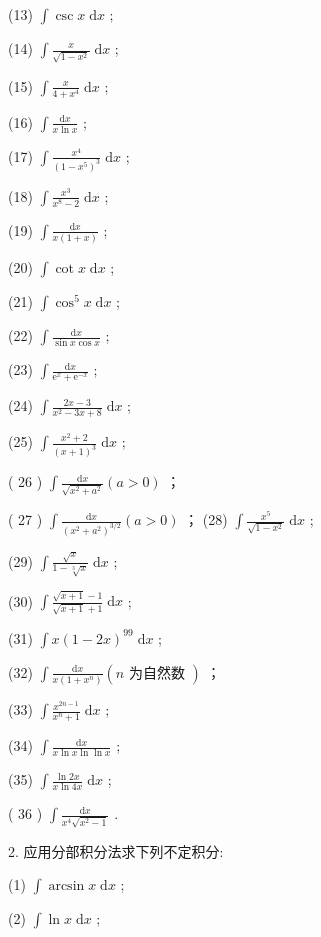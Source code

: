 (13) \(\int \csc x\mathrm{\;d}x\) ;

(14) \(\int \frac{x}{\sqrt{1 - {x}^{2}}}\mathrm{\;d}x\) ;

(15) \(\int \frac{x}{4 + {x}^{4}}\mathrm{\;d}x\) ;

(16) \(\int \frac{\mathrm{d}x}{x\ln x}\) ;

(17) \(\int \frac{{x}^{4}}{{\left( 1 - {x}^{5}\right) }^{3}}\mathrm{\;d}x\) ;

(18) \(\int \frac{{x}^{3}}{{x}^{8} - 2}\mathrm{\;d}x\) ;

(19) \(\int \frac{\mathrm{d}x}{x\left( {1 + x}\right) }\) ;

(20) \(\int \cot x\mathrm{\;d}x\) ;

(21) \(\int {\cos }^{5}x\mathrm{\;d}x\) ;

(22) \(\int \frac{\mathrm{d}x}{\sin x\cos x}\) ;

(23) \(\int \frac{\mathrm{d}x}{{\mathrm{e}}^{x} + {\mathrm{e}}^{-x}}\) ;

(24) \(\int \frac{{2x} - 3}{{x}^{2} - {3x} + 8}\mathrm{\;d}x\) ;

(25) \(\int \frac{{x}^{2} + 2}{{\left( x + 1\right) }^{3}}\mathrm{\;d}x\) ;

( 26 ) \(\int \frac{\mathrm{d}x}{\sqrt{{x}^{2} + {a}^{2}}}\left( {a > 0}\right)\) ；

( 27 ) \(\int \frac{\mathrm{d}x}{{\left( {x}^{2} + {a}^{2}\right) }^{3/2}}\left( {a > 0}\right)\) ； (28) \(\int \frac{{x}^{5}}{\sqrt{1 - {x}^{2}}}\mathrm{\;d}x\) ;

(29) \(\int \frac{\sqrt{x}}{1 - \sqrt[3]{x}}\mathrm{\;d}x\) ;

(30) \(\int \frac{\sqrt{x + 1} - 1}{\sqrt{x + 1} + 1}\mathrm{\;d}x\) ;

(31) \(\int x{\left( 1 - 2x\right) }^{99}\mathrm{\;d}x\) ;

(32) \(\int \frac{\mathrm{d}x}{x\left( {1 + {x}^{n}}\right) }\left( {n\text{ 为自然数 }}\right)\) ；

(33) \(\int \frac{{x}^{{2n} - 1}}{{x}^{n} + 1}\mathrm{\;d}x\) ;

(34) \(\int \frac{\mathrm{d}x}{x\ln x\ln \ln x}\) ;

(35) \(\int \frac{\ln {2x}}{x\ln {4x}}\mathrm{\;d}x\) ;

( 36 ) \(\int \frac{\mathrm{d}x}{{x}^{4}\sqrt{{x}^{2} - 1}}\) .

2. 应用分部积分法求下列不定积分:

(1) \(\int \arcsin x\mathrm{\;d}x\) ;

(2) \(\int \ln x\mathrm{\;d}x\) ;


